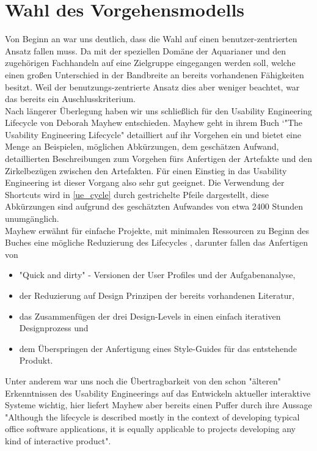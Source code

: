\chapter{Wahl des Vorgehensmodells}
Von Beginn an war uns deutlich, dass die Wahl auf einen benutzer-zentrierten Ansatz fallen muss. Da mit der speziellen Domäne der Aquarianer und den zugehörigen Fachhandeln auf eine Zielgruppe eingegangen werden soll, welche einen großen Unterschied in der Bandbreite an bereits vorhandenen Fähigkeiten besitzt. Weil der benutzungs-zentrierte Ansatz dies aber weniger beachtet, war das bereits ein Auschlusskriterium.\\
 
Nach längerer Überlegung haben wir uns schließlich für den Usability Engineering Lifecycle von Deborah Mayhew entschieden. Mayhew geht in ihrem Buch `"The Usability Engineering Lifecycle" detailliert auf ihr Vorgehen ein und bietet eine Menge an Beispielen, möglichen Abkürzungen, dem geschätzen Aufwand, detaillierten Beschreibungen zum Vorgehen fürs Anfertigen der Artefakte und den Zirkelbezügen zwischen den Artefakten. Für einen Einstieg in das Usability Engineering ist dieser Vorgang also sehr gut geeignet. 
Die Verwendung der Shortcuts wird in \ref{ue_cycle} durch gestrichelte Pfeile dargestellt, diese Abkürzungen sind aufgrund des geschätzten Aufwandes von etwa 2400 Stunden unumgänglich.\\
Mayhew erwähnt für einfache Projekte, mit minimalen Ressourcen zu Beginn des Buches eine mögliche Reduzierung des Lifecycles \cite[25]{Mayhew:UEL}, darunter fallen das Anfertigen von 
\begin{itemize}
 \item "Quick and dirty" - Versionen der User Profiles und der Aufgabenanalyse,
 \item der Reduzierung auf Design Prinzipen der bereits vorhandenen Literatur,
 \item das Zusammenfügen der drei Design-Levels in einen einfach iterativen Designprozess und
 \item dem Überspringen der Anfertigung eines Style-Guides für das entstehende Produkt.
\end{itemize}

Unter anderem war uns noch die Übertragbarkeit von den schon "älteren" Erkenntnissen des Usability Engineerings auf das Entwickeln aktueller interaktive Systeme wichtig, hier liefert Mayhew aber bereits einen Puffer durch ihre Aussage "Although the lifecycle is described mostly in the context of developing typical office software applications, it is equally applicable to projects developing any kind of interactive product". \cite[5]{Mayhew:UEL}

